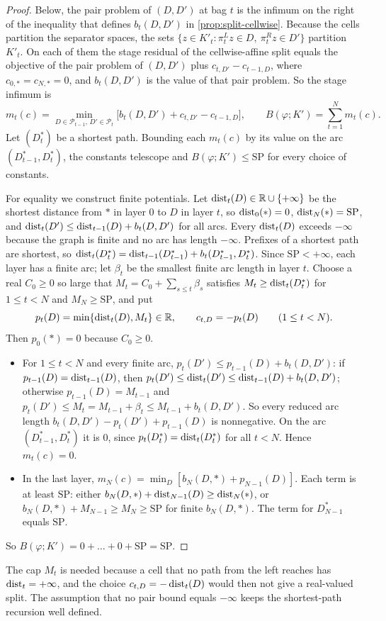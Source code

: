 \begin{proof}
Below, the pair problem of $(D,D')$ at bag $t$ is the infimum on the right of the inequality that defines $b_t(D,D')$ in \cref{prop:split-cellwise}.
Because the cells partition the separator spaces, the sets $\{z\in K'_t:\pi^L_tz\in D,\ \pi^R_tz\in D'\}$ partition $K'_t$.
On each of them the stage residual of the cellwise-affine split equals the objective of the pair problem of $(D,D')$ plus $c_{t,D'}-c_{t-1,D}$, where $c_{0,\ast}=c_{N,\ast}=0$, and $b_t(D,D')$ is the value of that pair problem.
So the stage infimum is
\[
  m_t(c)=\min_{D\in\mathcal P_{t-1},\,D'\in\mathcal P_t}
  \bigl[b_t(D,D')+c_{t,D'}-c_{t-1,D}\bigr],
  \qquad B(\varphi;K')=\sum_{t=1}^Nm_t(c).
\]
Let $(D^*_t)$ be a shortest path.
Bounding each $m_t(c)$ by its value on the arc $(D^*_{t-1},D^*_t)$, the constants telescope and $B(\varphi;K')\le\mathrm{SP}$ for every choice of constants.

For equality we construct finite potentials.
Let $\operatorname{dist}_t(D)\in\mathbb{R}\cup\{+\infty\}$ be the shortest distance from $\ast$ in layer $0$ to $D$ in layer $t$, so $\operatorname{dist}_0(\ast)=0$, $\operatorname{dist}_N(\ast)=\mathrm{SP}$, and $\operatorname{dist}_t(D')\le \operatorname{dist}_{t-1}(D)+b_t(D,D')$ for all arcs.
Every $\operatorname{dist}_t(D)$ exceeds $-\infty$ because the graph is finite and no arc has length $-\infty$.
Prefixes of a shortest path are shortest, so $\operatorname{dist}_t(D^*_t)=\operatorname{dist}_{t-1}(D^*_{t-1})+b_t(D^*_{t-1},D^*_t)$.
Since $\mathrm{SP}<+\infty$, each layer has a finite arc; let $\beta_t$ be the smallest finite arc length in layer $t$.
Choose a real $C_0\ge0$ so large that $M_t=C_0+\sum_{s\le t}\beta_s$ satisfies $M_t\ge \operatorname{dist}_t(D^*_t)$ for $1\le t<N$ and $M_N\ge\mathrm{SP}$, and put
\[
  p_t(D)=\min\{\operatorname{dist}_t(D),M_t\}\in\mathbb{R},\qquad c_{t,D}=-p_t(D)\qquad(1\le t<N).
\]
Then $p_0(\ast)=0$ because $C_0\ge0$.
\begin{itemize}
\item For $1\le t<N$ and every finite arc, $p_t(D')\le p_{t-1}(D)+b_t(D,D')$:
  if $p_{t-1}(D)=\operatorname{dist}_{t-1}(D)$, then $p_t(D')\le \operatorname{dist}_t(D')\le \operatorname{dist}_{t-1}(D)+b_t(D,D')$;
  otherwise $p_{t-1}(D)=M_{t-1}$ and $p_t(D')\le M_t=M_{t-1}+\beta_t\le M_{t-1}+b_t(D,D')$.
  So every reduced arc length $b_t(D,D')-p_t(D')+p_{t-1}(D)$ is nonnegative.
  On the arc $(D^*_{t-1},D^*_t)$ it is $0$, since $p_t(D^*_t)=\operatorname{dist}_t(D^*_t)$ for all $t<N$.
  Hence $m_t(c)=0$.
\item In the last layer, $m_N(c)=\min_D[b_N(D,\ast)+p_{N-1}(D)]$.
  Each term is at least $\mathrm{SP}$: either $b_N(D,\ast)+\operatorname{dist}_{N-1}(D)\ge \operatorname{dist}_N(\ast)$, or $b_N(D,\ast)+M_{N-1}\ge M_N\ge\mathrm{SP}$ for finite $b_N(D,\ast)$.
  The term for $D^*_{N-1}$ equals $\mathrm{SP}$.
\end{itemize}
So $B(\varphi;K')=0+\dots+0+\mathrm{SP}=\mathrm{SP}$.
\end{proof}

The cap $M_t$ is needed because a cell that no path from the left reaches has $\operatorname{dist}_t=+\infty$, and the choice $c_{t,D}=-\operatorname{dist}_t(D)$ would then not give a real-valued split.
The assumption that no pair bound equals $-\infty$ keeps the shortest-path recursion well defined.
